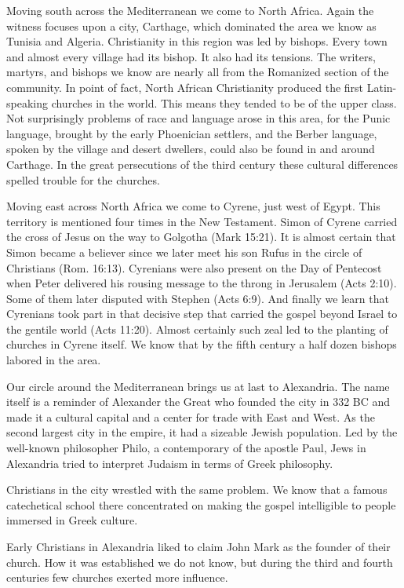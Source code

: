 Moving south across the Mediterranean we come to North Africa. Again the witness focuses upon a
city, Carthage, which dominated the area we know as Tunisia and Algeria. Christianity in this region
was led by bishops. Every town and almost every village had its bishop. It also had its tensions.
The writers, martyrs, and bishops we know are nearly all from the Romanized section of the
community. In point of fact, North African Christianity produced the first Latin-speaking churches
in the world. This means they tended to be of the upper class. Not surprisingly problems of race and
language arose in this area, for the Punic language, brought by the early Phoenician settlers, and
the Berber language, spoken by the village and desert dwellers, could also be found in and around
Carthage. In the great persecutions of the third century these cultural differences spelled trouble
for the churches.

Moving east across North Africa we come to Cyrene, just west of Egypt. This territory is mentioned
four times in the New Testament. Simon of Cyrene carried the cross of Jesus on the way to Golgotha
(Mark 15:21). It is almost certain that Simon became a believer since we later meet his son Rufus in
the circle of Christians (Rom. 16:13). Cyrenians were also present on the Day of Pentecost when
Peter delivered his rousing message to the throng in Jerusalem (Acts 2:10). Some of them later
disputed with Stephen (Acts 6:9). And finally we learn that Cyrenians took part in that decisive
step that carried the gospel beyond Israel to the gentile world (Acts 11:20). Almost certainly such
zeal led to the planting of churches in Cyrene itself. We know that by the fifth century a half
dozen bishops labored in the area.

Our circle around the Mediterranean brings us at last to Alexandria. The name itself is a reminder
of Alexander the Great who founded the city in 332 BC and made it a cultural capital and a center
for trade with East and West. As the second largest city in the empire, it had a sizeable Jewish
population. Led by the well-known philosopher Philo, a contemporary of the apostle Paul, Jews in
Alexandria tried to interpret Judaism in terms of Greek philosophy.

Christians in the city wrestled with the same problem. We know that a famous catechetical school
there concentrated on making the gospel intelligible to people immersed in Greek culture.

Early Christians in Alexandria liked to claim John Mark as the founder of their church. How it was
established we do not know, but during the third and fourth centuries few churches exerted more
influence.

